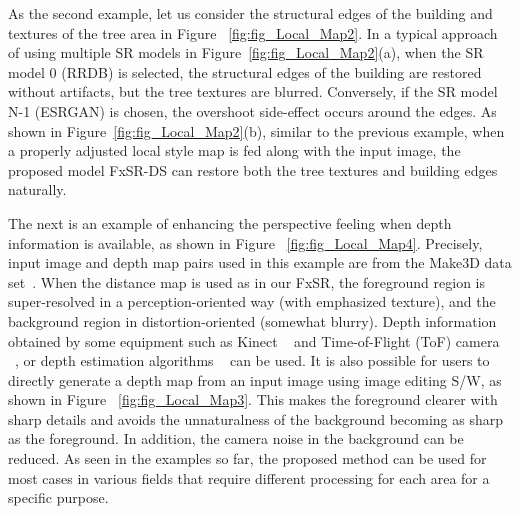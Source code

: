 \documentclass{article}
\begin{document}
As the second example, let us consider the structural edges of the building and textures of the tree area in Figure ~\ref{fig:fig_Local_Map2}. In a typical approach of using multiple SR models in Figure~\ref{fig:fig_Local_Map2}(a), when the SR model 0 (RRDB) is selected, the structural edges of the building are restored without artifacts, but the tree textures are blurred. Conversely, if the SR model N-1 (ESRGAN) is chosen, the overshoot side-effect occurs around the edges. As shown in Figure~\ref{fig:fig_Local_Map2}(b), similar to the previous example, when a properly adjusted local style map is fed along with the input image, the proposed model FxSR-DS can restore both the tree textures and building edges naturally.

The next is an example of enhancing the perspective feeling when depth information is available, as shown in Figure ~\ref{fig:fig_Local_Map4}. Precisely, input image and depth map pairs used in this example are from the Make3D data set~\cite{saxena2005learning, saxena20083}. When the distance map is used as  in our FxSR, the foreground region is super-resolved in a perception-oriented way (with emphasized texture), and the background region in distortion-oriented (somewhat blurry). Depth information obtained by some equipment such as Kinect ~\cite{izadi2011kinectfusion} and Time-of-Flight (ToF) camera ~\cite{cui2012algorithms, cui20103d}, or depth estimation algorithms ~\cite{ming2021deep} can be used. It is also possible for users to directly generate a depth map from an input image using image editing S/W, as shown in Figure ~\ref{fig:fig_Local_Map3}. This makes the foreground clearer with sharp details and avoids the unnaturalness of the background becoming as sharp as the foreground. In addition, the camera noise in the background can be reduced. As seen in the examples so far, the proposed method can be used for most cases in various fields that require different processing for each area for a specific purpose.
\end{document}

